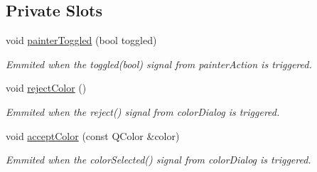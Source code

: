 \subsection*{Private Slots}
\begin{DoxyCompactItemize}
\item 
void \hyperlink{class_main_window_a8ccae81777f7010d6204509dc5fc111f}{painter\+Toggled} (bool toggled)
\begin{DoxyCompactList}\small\item\em Emmited when the toggled(bool) signal from painter\+Action is triggered. \end{DoxyCompactList}\item 
void \hyperlink{class_main_window_ae066828157a539ceab8d1c2e491073bd}{reject\+Color} ()
\begin{DoxyCompactList}\small\item\em Emmited when the reject() signal from color\+Dialog is triggered. \end{DoxyCompactList}\item 
void \hyperlink{class_main_window_aa54416d9aa58d310651f4cd7c6e071bb}{accept\+Color} (const Q\+Color \&color)
\begin{DoxyCompactList}\small\item\em Emmited when the color\+Selected() signal from color\+Dialog is triggered. \end{DoxyCompactList}\end{DoxyCompactItemize}
